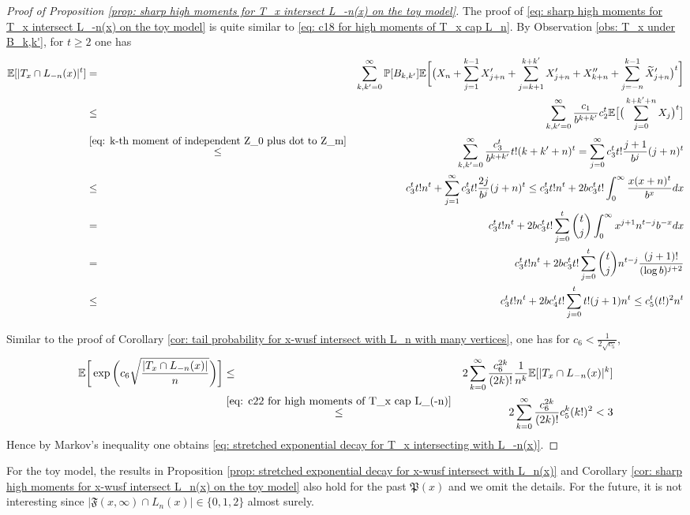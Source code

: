 \documentclass[12pt]{article}
\numberwithin{equation}{section}
\newcommand{\1}{\mathbf{1}}
\begin{document}
\begin{proof}[Proof of Proposition \ref{prop: sharp high moments for T_x intersect L_-n(x) on the toy model}]
	The proof of  \eqref{eq: sharp high moments for T_x intersect L_-n(x) on the toy model} is quite similar to \eqref{eq: c18 for high moments of T_x cap L_n}. By Observation \ref{obs: T_x under B_k,k'}, for $t\geq2$ one has 
	\begin{eqnarray}\label{eq: c22 for high moments of T_x cap L_(-n)}
	\mathbb{E}[|T_x\cap L_{-n}(x)|^t]
	&=&\sum_{k,k'=0}^{\infty} \mathbb{P}[B_{k,k'}]\mathbb{E}\bigg[ \big(X_{n}+\sum_{j=1}^{k-1}X_{j+n}'+\sum_{j=k+1}^{k+k'}X_{j+n}'+X_{k+n}''+\sum_{j=-n}^{k-1}\widetilde{X}_{j+n}'\big)^t\bigg]\nonumber\\
	&\leq&\sum_{k,k'=0}^{\infty}\frac{c_1}{b^{k+k'}}c_2^t\mathbb{E}\big[\big(\sum_{j=0}^{k+k'+n}X_j\big)^t\big]\nonumber\\
	&\stackrel{\eqref{eq: k-th moment of independent Z_0 plus dot to Z_m}}{\leq}&
	\sum_{k,k'=0}^{\infty}\frac{c_3^t}{b^{k+k'}}t!(k+k'+n)^t=\sum_{j=0}^{\infty}c_3^tt! \frac{j+1}{b^j}(j+n)^t\nonumber\\
	&\leq&c_3^tt!n^t+\sum_{j=1}^{\infty}c_3^tt!\frac{2j}{b^j}(j+n)^t\leq
	c_3^t t!n^t+ 2bc_3^tt!\int_{0}^{\infty}\frac{x(x+n)^t}{b^x}dx\nonumber\\
	&=&	c_3^t t!n^t+ 2bc_3^tt!\sum_{j=0}^{t}\binom{t}{j}\int_{0}^{\infty}x^{j+1}n^{t-j}b^{-x}dx\nonumber\\
	&=&c_3^t t!n^t+ 2bc_3^tt!\sum_{j=0}^{t}\binom{t}{j} n^{t-j}\frac{(j+1)!}{(\log b)^{j+2}}\nonumber\\
	&\leq&c_3^t t!n^t+ 2bc_4^tt!\sum_{j=0}^{t}t!(j+1) n^{t}\leq c_5^t(t!)^2n^t
	\end{eqnarray}
	
	Similar to the proof of Corollary \ref{cor: tail probability for x-wusf intersect with L_n with many vertices}, one has for $c_6<\frac{1}{2\sqrt{c_5}}$, 
	\begin{eqnarray}
	\mathbb{E}\bigg[\exp\bigg(c_6\sqrt{\frac{|T_x\cap L_{-n}(x)|}{n}} \bigg)\bigg]
	&\leq&2\sum_{k=0}^{\infty}\frac{c_6^{2k}}{(2k)!}\frac{1}{n^k}\mathbb{E}[|T_x\cap L_{-n}(x)|^k]\nonumber\\
	&\stackrel{\eqref{eq: c22 for high moments of T_x cap L_(-n)}}{\leq}&
	2\sum_{k=0}^{\infty}\frac{c_6^{2k}}{(2k)!} c_5^k(k!)^2<3
	\end{eqnarray}
	Hence by Markov's inequality one obtains \eqref{eq: stretched exponential decay for T_x intersecting with L_-n(x)}.
	
\end{proof}


For the toy model, the results in Proposition \ref{prop: stretched exponential decay for x-wusf intersect with L_n(x)} and Corollary \ref{cor: sharp high moments for x-wusf intersect L_n(x) on the toy model} also hold for the past $\mathfrak{P}(x)$ and we omit the details. For the future, it is not interesting since $|\mathfrak{F}(x,\infty)\cap L_n(x)|\in\{0,1,2\}$ almost surely.  




\end{document}
